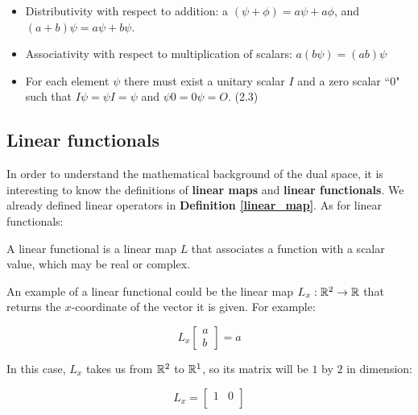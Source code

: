 \begin{definition}
\begin{itemize}
\begin{enumerate}
\begin{itemize}
                \item Distributivity with respect to addition: a $(\psi + \phi) = a \psi + a \phi$, and $(a + b)\psi = a\psi + b\psi$.
                \item Associativity with respect to multiplication of scalars: $a (b \psi) = (ab)\psi$
                \item For each element $\psi$ there must exist a unitary scalar $I$ and a zero scalar ``$0$" such that $I\psi = \psi I = \psi$ and $\psi 0 = 0\psi = O$.
                (2.3)
            \end{itemize}
        \end{enumerate}
    \end{itemize}
\end{definition}

\subsection{Linear functionals} \label{linfunct}

In order to understand the mathematical background of the dual space, it is interesting to know the definitions of \textbf{linear maps} and \textbf{linear functionals}. We already defined linear operators in \textbf{Definition \ref{linear_map}}. As for linear functionals:

\begin{definition}
    A linear functional is a linear map $L$ that associates a function with a scalar value, which may be real or complex.
\end{definition}

An example of a linear functional could be the linear map $L_x : \mathbb{R}^2 \to \mathbb{R}$ that returns the $x$-coordinate of the vector it is given. For example:

\begin{equation}
    L_x\begin{bmatrix}
        a \\ b
    \end{bmatrix} = a
\end{equation}

In this case, $L_x$ takes us from $\mathbb{R}^2$ to $\mathbb{R}^1$, so its matrix will be $1$ by $2$ in dimension:

\begin{equation}
    L_x = \begin{bmatrix}
        1 & 0 \\
    \end{bmatrix}
\end{equation}

